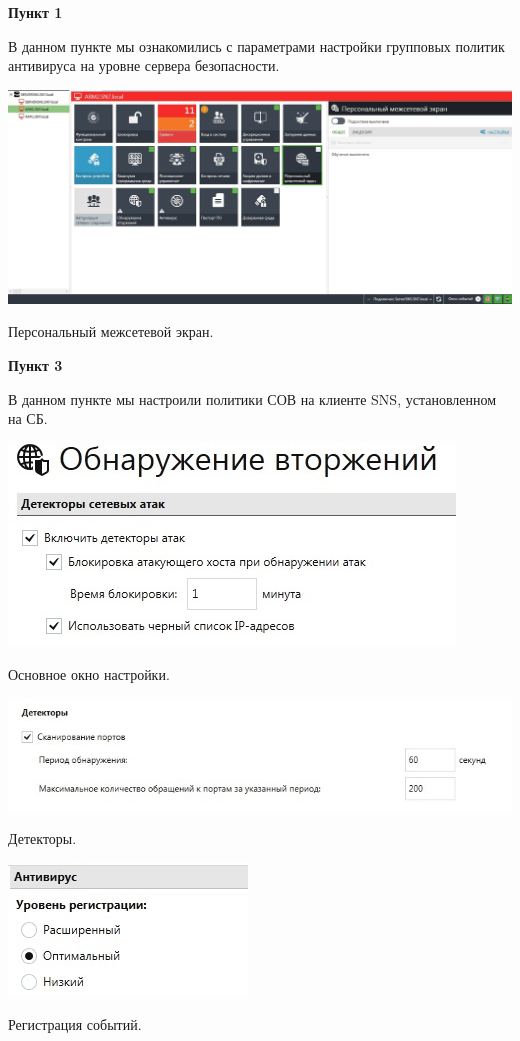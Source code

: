 \documentclass[a4paper,14pt]{extarticle}
\begin{document}
    \textbf{Пункт 1}
    \vspace{-3ex}
    \begin{center}
        \singlespacing
        В данном пункте мы ознакомились с параметрами настройки групповых политик антивируса на
уровне сервера безопасности. 

        \includegraphics[scale=0.3]{pics/1.jpg}

      Персональный межсетевой экран.
    \end{center}

    \textbf{Пункт 3}
    \vspace{-3ex}
    \begin{center}
        \singlespacing
        В данном пункте мы настроили политики СОВ на клиенте SNS, установленном на СБ.

        \includegraphics[scale=0.8]{pics/3_1.jpg}

        Основное окно настройки.

        \includegraphics[scale=0.65]{pics/3_2.jpg}

        Детекторы.

        \includegraphics[scale=0.8]{pics/3_3.jpg}
 
        Регистрация событий.
    \end{center}
\end{document}
